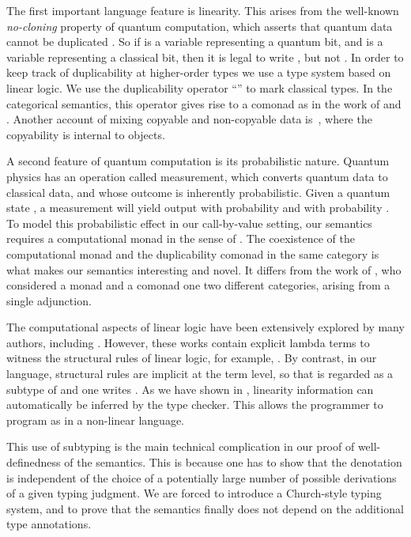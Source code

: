 \documentclass{llncs}
\begin{document}
The first important language feature is linearity. This arises from
the well-known {\em no-cloning} property of quantum computation, which
asserts that quantum data cannot be duplicated {\cite{WZ82}}. So if
 is a variable representing a quantum bit, and  is a
variable representing a classical bit, then it is legal to write
, but not . 
In order to keep track of duplicability at higher-order types we use
a type system based on linear logic. We use the duplicability operator
``'' to mark classical types.
In the categorical semantics, this
operator gives rise to a comonad as in the work of {\cite{Seely89}}
and {\cite{benton92linear}}.
Another account of mixing copyable and non-copyable data is~\cite{coecke06quantum},
where the copyability is internal to objects.

A second feature of quantum computation is its probabilistic nature.
Quantum physics has an operation called measurement, which converts
quantum data to classical data, and whose outcome is inherently
probabilistic. Given a quantum state , a
measurement will yield output  with probability  and
 with probability .  To model this probabilistic effect
in our call-by-value setting, our semantics requires a computational
monad in the sense of {\cite{moggi91notions}}. The coexistence of the
computational monad  and the duplicability comonad  in the same
category is what makes our semantics interesting and novel. It differs
from the work of \cite{benton96linear}, who considered a monad and a
comonad one two different categories, arising from a single
adjunction.

The computational aspects of linear logic have been extensively
explored by many authors, including \cite{bierman93intuitionistic,benton92linear,benton93term,abramsky93computational,wadler92substitute}. However, these works contain explicit
lambda terms to witness the structural rules of linear logic, for
example, . By contrast, in our
language, structural rules are implicit at the term level, so that
 is regarded as a subtype of  and one writes . As we have shown in {\cite{selinger05lambda}}, linearity
information can automatically be inferred by the type checker.  This
allows the programmer to program as in a non-linear language. 

This use of subtyping is the main technical complication in our proof
of well-definedness of the semantics. This is because one has to show
that the denotation is independent of the choice of a potentially
large number of possible derivations of a given typing judgment. We
are forced to introduce a Church-style typing system, and to prove
that the semantics finally does not depend on the additional type
annotations.
\end{document}
